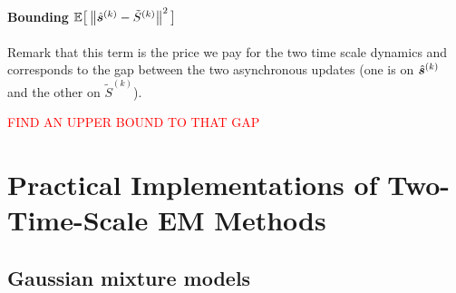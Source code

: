 \documentclass[11pt]{article}
\makeatletter
\renewenvironment{proof}[1][\proofname]{%
   \par\pushQED{\qed}\normalfont%
   \topsep6\p@\@plus6\p@\relax
   \trivlist\item[\hskip\labelsep\bfseries#1]%
   \ignorespaces
}{%
   \popQED\endtrivlist\@endpefalse
}
\theoremstyle{t}
\makeatother
\begin{document}
\begin{proof}
\paragraph{ Bounding $ \mathbb{E}\big[\left\Vert  \hat{\bm s}^{(k)} -  \tilde{S}^{(k)}  \right\Vert^2\big] $} Remark that this term is the price we pay for the two time scale dynamics and corresponds to the gap between the two asynchronous updates (one is on  $\hat{\bm s}^{(k)}$ and the other on $ \tilde{S}^{(k)}$).

\textcolor{red}{FIND AN UPPER BOUND TO THAT GAP}

%

\end{proof}




\clearpage

\section{Practical Implementations of Two-Time-Scale EM Methods}
\subsection{Gaussian mixture models}\label{app:gmm_update}
\end{document}
